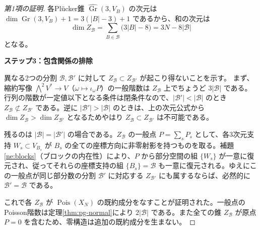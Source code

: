 \begin{proof}[第1項の証明]
各Pl\"ucker錐 $\widehat{\operatorname{Gr}}(3,V_B)$ の次元は $\dim\operatorname{Gr}(3,V_B)+1=3(|B|-3)+1$ であるから、和の次元は
\begin{equation}
 \dim Z_{\mathcal B}=\sum_{B\in\mathcal B}\bigl(3|B|-8\bigr)=3N-8|\mathcal B|
\end{equation}
となる。

\par\medskip\noindent\textbf{ステップ3：包含関係の排除}\par\nobreak\smallskip
異なる2つの分割 $\mathcal B,\mathcal B'$ に対して $Z_{\mathcal B}\subset Z_{\mathcal B'}$ が起こり得ないことを示す。
まず、縮約写像 $\bigwedge^2V^*\to V$（$\omega\mapsto\iota_\omega P$）の一般階数は $Z_{\mathcal B}$ 上でちょうど $3|\mathcal B|$ である。行列の階数が一定値以下となる条件は閉条件なので、$|\mathcal B'|<|\mathcal B|$ のとき $Z_{\mathcal B}\not\subset Z_{\mathcal B'}$ である。逆に $|\mathcal B'|>|\mathcal B|$ のときは、上の次元公式から $\dim Z_{\mathcal B}>\dim Z_{\mathcal B'}$ となるためやはり $Z_{\mathcal B}\subset Z_{\mathcal B'}$ は不可能である。

残るのは $|\mathcal B|=|\mathcal B'|$ の場合である。$Z_{\mathcal B}$ の一般点 $P=\sum_s P_s$ として、各3次元支持 $W_s\subset V_{B_s}$ が $B_s$ の全ての座標方向に非零射影を持つものを取る。補題\ref{ne:blocks}（ブロックの内在性）により、$P$ から部分空間の組 $\{W_s\}$ が一意に復元され、従ってそれらの座標支持の組 $\{B_s\}=\mathcal B$ も一意に復元される。ゆえにこの一般点が同じ部分数の分割 $\mathcal B'$ に対応する $Z_{\mathcal B'}$ にも属するならば、必然的に $\mathcal B'=\mathcal B$ である。

これで各 $Z_{\mathcal B}$ が $\operatorname{Pois}(X_N)$ の既約成分をなすことが証明された。一般点のPoisson階数は定理\ref{thm:pg-normal}により $2|\mathcal B|$ である。また全ての錐 $Z_{\mathcal B}$ が原点 $P=0$ を含むため、零構造は追加の既約成分を生まない。
\end{proof}

